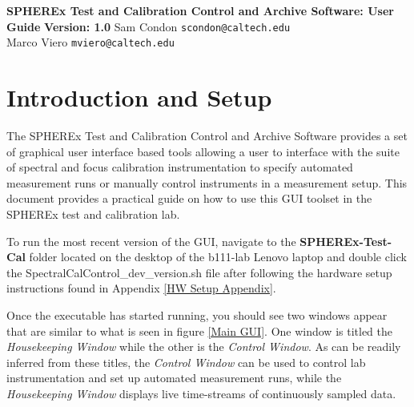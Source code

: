 \documentclass{article}
\newcommand{\version}{1.0}
\begin{document}
	\begin{center}
		{\Large\bf SPHEREx Test and Calibration Control and Archive Software: User Guide}
		\vskip 0.25in
		{\large\bf Version: \version}
		\vskip 0.25in
		Sam Condon \texttt{scondon@caltech.edu} \\
		Marco Viero \texttt{mviero@caltech.edu} 
		\vskip 0.125in
	\end{center}
	
\section{Introduction and Setup}

The SPHEREx Test and Calibration Control and Archive Software provides a set of graphical user interface based tools allowing a user to interface with the suite of spectral and focus calibration instrumentation to specify automated measurement runs or manually control instruments in a measurement setup. This document provides a practical guide on how to use this GUI toolset in the SPHEREx test and calibration lab.

To run the most recent version of the GUI, navigate to the \textbf{SPHEREx-Test-Cal} folder located on the desktop of the b111-lab Lenovo laptop and double click the SpectralCalControl\_dev\_version.sh file after following the hardware setup instructions found in Appendix \ref{HW Setup Appendix}. 

Once the executable has started running, you should see two windows appear that are similar to what is seen in figure \ref{Main GUI}. One window is titled the \emph{Housekeeping Window} while the other is the \emph{Control Window}. As can be readily inferred from these titles, the \emph{Control Window} can be used to control lab instrumentation and set up automated measurement runs, while the \emph{Housekeeping Window} displays live time-streams of continuously sampled data.
\end{document}
